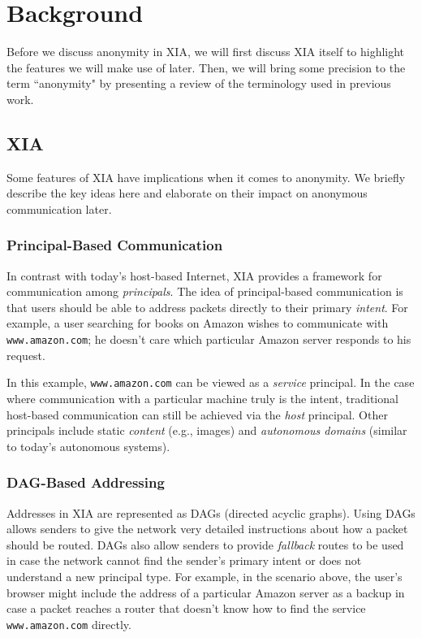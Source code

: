 \documentclass{article}
\begin{document}
\section{Background}
\label{background}
Before we discuss anonymity in XIA, we will first discuss XIA itself to highlight the features we will make use of later. Then, we will bring some precision to the term ``anonymity" by presenting a review of the terminology used in previous work.

\subsection{XIA}
Some features of XIA have implications when it comes to anonymity. We briefly describe the key ideas here and elaborate on their impact on anonymous communication later.
\subsubsection{Principal-Based Communication}
In contrast with today's host-based Internet, XIA provides a framework for communication among \emph{principals}. The idea of principal-based communication is that users should be able to address packets directly to their primary \emph{intent}. For example, a user searching for books on Amazon wishes to communicate with \texttt{www.amazon.com}; he doesn't care which particular Amazon server responds to his request.

In this example, \texttt{www.amazon.com} can be viewed as a \emph{service} principal. In the case where communication with a particular machine truly is the intent, traditional host-based communication can still be achieved via the \emph{host} principal. Other principals include static \emph{content} (e.g., images) and \emph{autonomous domains} (similar to today's autonomous systems).

\subsubsection{DAG-Based Addressing}
Addresses in XIA are represented as DAGs (directed acyclic graphs). Using DAGs allows senders to give the network very detailed instructions about how a packet should be routed. DAGs also allow senders to provide {\em fallback} routes to be used in case the network cannot find the sender's primary intent or does not understand a new principal type. For example, in the scenario above, the user's browser might include the address of a particular Amazon server as a backup in case a packet reaches a router that doesn't know how to find the service \texttt{www.amazon.com} directly.
\end{document}
